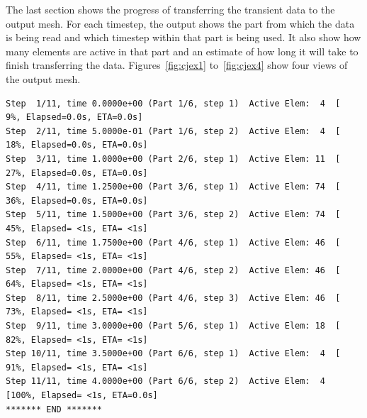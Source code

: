 The last section shows the progress of transferring the transient data
to the output mesh.  For each timestep, the output shows the part from
which the data is being read and which timestep within that part is
being used.  It also show how many elements are active in that part
and an estimate of how long it will take to finish transferring the
data.  Figures~\ref{fig:cjex1} to~\ref{fig:cjex4} show four views of
the output mesh.

\begin{verbatim}
Step  1/11, time 0.0000e+00 (Part 1/6, step 1)  Active Elem:  4  [  9%, Elapsed=0.0s, ETA=0.0s]
Step  2/11, time 5.0000e-01 (Part 1/6, step 2)  Active Elem:  4  [ 18%, Elapsed=0.0s, ETA=0.0s]
Step  3/11, time 1.0000e+00 (Part 2/6, step 1)  Active Elem: 11  [ 27%, Elapsed=0.0s, ETA=0.0s]
Step  4/11, time 1.2500e+00 (Part 3/6, step 1)  Active Elem: 74  [ 36%, Elapsed=0.0s, ETA=0.0s]
Step  5/11, time 1.5000e+00 (Part 3/6, step 2)  Active Elem: 74  [ 45%, Elapsed= <1s, ETA= <1s]
Step  6/11, time 1.7500e+00 (Part 4/6, step 1)  Active Elem: 46  [ 55%, Elapsed= <1s, ETA= <1s]
Step  7/11, time 2.0000e+00 (Part 4/6, step 2)  Active Elem: 46  [ 64%, Elapsed= <1s, ETA= <1s]
Step  8/11, time 2.5000e+00 (Part 4/6, step 3)  Active Elem: 46  [ 73%, Elapsed= <1s, ETA= <1s]
Step  9/11, time 3.0000e+00 (Part 5/6, step 1)  Active Elem: 18  [ 82%, Elapsed= <1s, ETA= <1s]
Step 10/11, time 3.5000e+00 (Part 6/6, step 1)  Active Elem:  4  [ 91%, Elapsed= <1s, ETA= <1s]
Step 11/11, time 4.0000e+00 (Part 6/6, step 2)  Active Elem:  4  [100%, Elapsed= <1s, ETA=0.0s]
******* END *******
\end{verbatim}
